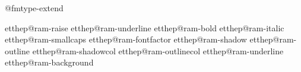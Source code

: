 \x@\let\csname  @@fmtype-extend\endcsname\@multiply@feature

\x@\let\csname getthep@ram-raise\endcsname\getthep@ramObeyRegularTop
\x@\let\csname getthep@ram-underline\endcsname\getthep@ramObeyRegularTop
\x@\let\csname getthep@ram-bold\endcsname\getthep@ramObeyRegularTop
\x@\let\csname getthep@ram-italic\endcsname\getthep@ramObeyRegularTop
\x@\let\csname getthep@ram-smallcaps\endcsname\getthep@ramObeyRegularTop
\x@\let\csname getthep@ram-fontfactor\endcsname\getthep@ramObeyRegularTop
\x@\let\csname getthep@ram-shadow\endcsname\getthep@ramObeyRegularTopChar
\x@\let\csname getthep@ram-outline\endcsname\getthep@ramObeyRegularTopChar
\x@\let\csname getthep@ram-shadowcol\endcsname\getthep@ramObeyRegularTopChar
\x@\let\csname getthep@ram-outlinecol\endcsname\getthep@ramObeyRegularTopChar
\x@\let\csname getthep@ram-underline\endcsname\getthep@ramObeyRegularTopChar
\x@\let\csname getthep@ram-background\endcsname\getthep@ramObeyRegularTopChar

\def\getmcp@ram#1{\getp@ram{#1}{\styst@kfirst}{\styst@k}}
\def\getmcp@ramR#1{\getp@ram{#1}{\styst@kfirst}{\styst@k}}

\def\getFp@ram#1#2#3{%
  \let\p@ram\relax
  \def\d@##1+##2+##3\E{\d@code{##1}{##2}\edef\tmpa{#2}\ifx\tmp\tmpa\getmcp@ram{#1}\else\getp@ram{#1}{#2}{#2}\fi}%
  \mctop\ifnotracestacks\poptracing\fi}
\def\getFp@ramR#1#2#3{\ifnotracestacks\pushtracing\fi
  \def\d@##1+##2+##3\E{\d@code{##1}{##2}\edef\tmpa{#2}\ifx\tmp\tmpa\getmcp@ramR{#1}\else\getp@ram{#1}{#2}{#2}\fi}%
  \mctop\ifnotracestacks\poptracing\fi}


